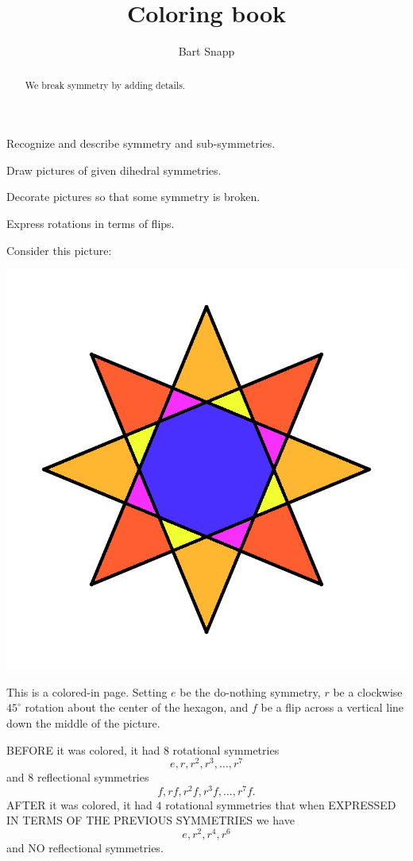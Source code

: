 \documentclass[noauthor,nooutcomes,12pt,hints]{ximera}
\title{Coloring book}
\author{Bart Snapp}
\begin{document}
\begin{abstract}
  We break symmetry by adding details.
\end{abstract}
\maketitle

\begin{listOutcomes}
\item Recognize and describe symmetry and sub-symmetries.
\item Draw pictures of given dihedral symmetries.
\item Decorate pictures so that some symmetry is broken.
\item Express rotations in terms of flips.
\end{listOutcomes}


Consider this picture:
\begin{center}
  \includegraphics[width=.6\textwidth]{egR4D8.png}
\end{center}

This is a colored-in page. Setting $e$ be the do-nothing symmetry, $r$
be a clockwise $45^\circ$ rotation about the center of the hexagon,
and $f$ be a flip across a vertical line down the middle of the
picture.

BEFORE it was colored, it had $8$ rotational symmetries
\[
e,r,r^2,r^3,\dots, r^7
\]
and $8$ reflectional symmetries
\[
f,rf,r^2f, r^3f,\dots,r^7f.
\]
AFTER it was colored, it had $4$ rotational symmetries that when
EXPRESSED IN TERMS OF THE PREVIOUS SYMMETRIES we have
\[
e,r^2,r^4,r^6
\]
and NO reflectional symmetries.

\mynewpage
\end{document}
